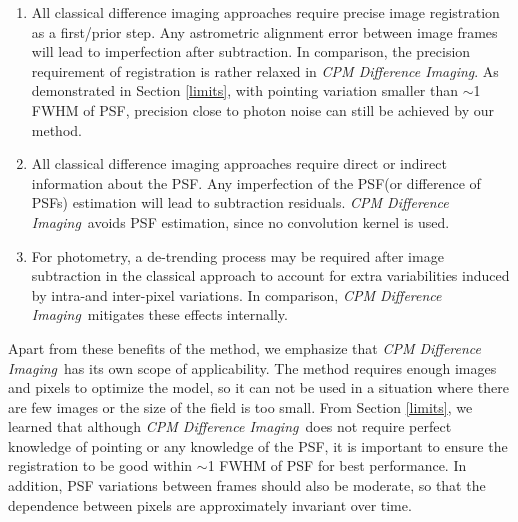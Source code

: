 \documentclass[12pt, preprint]{aastex}
\newcommand{\project}[1]{\textsl{#1}}
\newcommand{\cpmdiff}{\project{CPM Difference Imaging}}
\begin{document}
\begin{enumerate}
\item All classical difference imaging approaches require precise image registration as a first/prior step. 
Any astrometric alignment error between image frames will lead to imperfection after subtraction.
In comparison, the precision requirement of registration is rather relaxed in \cpmdiff. 
As demonstrated in Section \ref{limits}, with pointing variation smaller than $\sim$1 FWHM of PSF, precision close to photon noise can still be achieved by our method.  

\item All classical difference imaging approaches require direct or indirect information about the PSF. 
Any imperfection of the PSF(or difference of PSFs) estimation will lead to subtraction residuals.
\cpmdiff\ avoids PSF estimation, since no convolution kernel is used.

\item For photometry, a de-trending process may be required after image subtraction in the classical approach to account for extra variabilities induced by intra-and inter-pixel variations.
In comparison, \cpmdiff\ mitigates these effects internally.
\end{enumerate}

Apart from these benefits of the method, we emphasize that \cpmdiff\ has its own scope of applicability.
The method requires enough images and pixels to optimize the model, so it can not be used in a situation where there are few images or the size of the field is too small. 
From Section \ref{limits}, we learned that although \cpmdiff\ does not require perfect knowledge of pointing or any knowledge of the PSF, it is important to ensure the registration to be good within $\sim$1 FWHM of PSF for best performance.
In addition, PSF variations between frames should also be moderate, so that the dependence between pixels are approximately invariant over time.
\end{document}
